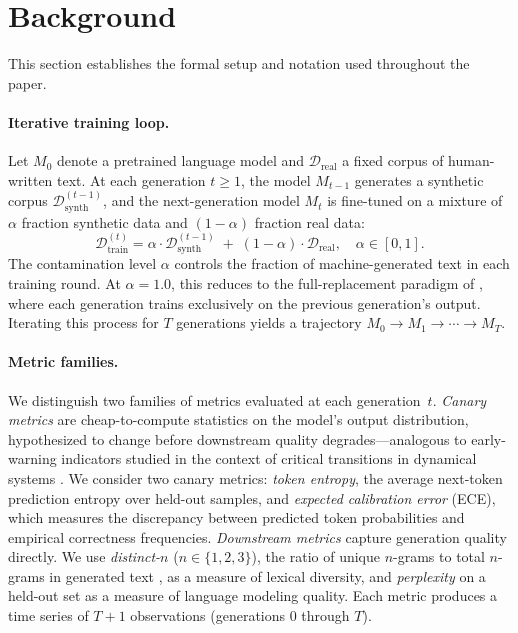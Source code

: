 \section{Background}
\label{sec:background}

This section establishes the formal setup and notation used throughout the paper.

\paragraph{Iterative training loop.}
Let $M_0$ denote a pretrained language model and $\mathcal{D}_\text{real}$ a fixed corpus of human-written text.
At each generation $t \geq 1$, the model $M_{t-1}$ generates a synthetic corpus $\mathcal{D}_\text{synth}^{(t-1)}$, and the next-generation model $M_t$ is fine-tuned on a mixture of $\alpha$ fraction synthetic data and $(1{-}\alpha)$ fraction real data:
\begin{equation}
    \mathcal{D}_\text{train}^{(t)} = \alpha \cdot \mathcal{D}_\text{synth}^{(t-1)} \;+\; (1{-}\alpha) \cdot \mathcal{D}_\text{real}, \quad \alpha \in [0, 1].
    \label{eq:mixing}
\end{equation}
The contamination level $\alpha$ controls the fraction of machine-generated text in each training round.
At $\alpha{=}1.0$, this reduces to the full-replacement paradigm of \citet{shumailov2024curse}, where each generation trains exclusively on the previous generation's output.
Iterating this process for $T$ generations yields a trajectory $M_0 \to M_1 \to \cdots \to M_T$.

\paragraph{Metric families.}
We distinguish two families of metrics evaluated at each generation~$t$.
\emph{Canary metrics} are cheap-to-compute statistics on the model's output distribution, hypothesized to change before downstream quality degrades---analogous to early-warning indicators studied in the context of critical transitions in dynamical systems \cite{scheffer2009early}.
We consider two canary metrics: \emph{token entropy}, the average next-token prediction entropy over held-out samples, and \emph{expected calibration error} (ECE), which measures the discrepancy between predicted token probabilities and empirical correctness frequencies.
\emph{Downstream metrics} capture generation quality directly.
We use \emph{distinct-$n$} ($n \in \{1, 2, 3\}$), the ratio of unique $n$-grams to total $n$-grams in generated text \cite{li2016diversity}, as a measure of lexical diversity, and \emph{perplexity} on a held-out set as a measure of language modeling quality.
Each metric produces a time series of $T{+}1$ observations (generations $0$ through $T$).

